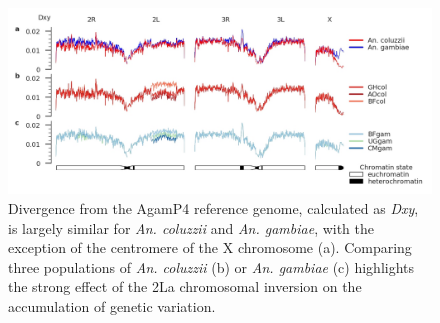 \documentclass[a4paper,11pt,abstracton,hidelinks]{scrartcl}
\begin{document}
\begin{figure}[H]
	\begin{center}
		\includegraphics*[width=6.3in]{notebooks/refdiff/refdiff_phase2_combined.jpg}
	\end{center}
	\caption{Divergence from the AgamP4 reference genome, calculated as \textit{Dxy}, is largely similar for \textit{An. coluzzii} and \textit{An. gambiae}, with the exception of the centromere of the X chromosome (a). Comparing three populations of \textit{An. coluzzii} (b) or \textit{An. gambiae} (c) highlights the strong effect of the 2La chromosomal inversion on the accumulation of genetic variation.}
	\label{fig:refdiff}
\end{figure}


\clearpage

%


\clearpage
\printbibliography
\end{document}
